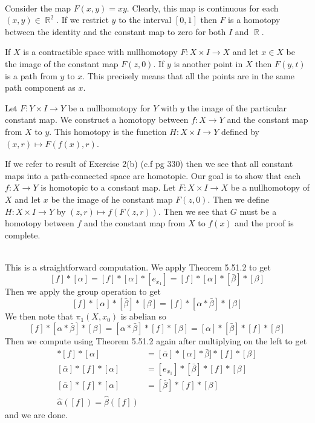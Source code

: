 \documentclass{article}
\DeclareMathOperator{\R}{\mathbb{R}}
\newcommand{\problem}[1]{\noindent{\textbf{Problem #1}}\\}
\newcommand{\problempart}[1]{\noindent{\textbf{(#1)}}}
\begin{document}
\problem{9.51.3}
\problempart{a} Consider the map $F(x,y) = xy$. Clearly, this map is continuous for each $(x,y) \in \R^2$. If we restrict $y$ to the interval $[0,1]$ then $F$ is a homotopy between the identity and the constant map to zero for both $I$ and $\R$. 

\problempart{b} If $X$ is a contractible space with nullhomotopy $F: X \times I \to X$ and let $x \in X$ be the image of the constant map $F(z,0)$. If $y$ is another point in $X$ then $F(y,t)$ is a path from $y$ to $x$. This precisely means that all the points are in the same path component as $x$. 

\problempart{c} Let $F: Y \times I \to Y$ be a nullhomotopy for $Y$ with $y$ the image of the particular constant map. We construct a homotopy between $f: X \to Y$ and the constant map from $X$ to $y$. This homotopy is the function $H: X \times I \to Y$ defined by $(x,r) \mapsto F(f(x), r)$.  

\problempart{d} If we refer to result of Exercise 2(b) (c.f pg 330) then we see that all constant maps into a path-connected space are homotopic. Our goal is to show that each $f: X \to Y$ is homotopic to a constant map. Let $F: X \times I \to X$ be a nullhomotopy of $X$ and let $x$ be the image of he constant map $F(z,0)$. Then we define $H: X\times I \to Y$ by $(z,r) \mapsto f(F(z,r))$. Then we see that $G$ must be a homotopy between $f$ and the constant map from $X$ to $f(x)$ and the proof is complete. 

\problem{9.52.3} This is a straightforward computation. We apply Theorem 5.51.2 to get
\[
[f] * [\alpha] = [f] * [\alpha] * [e_{x_1}] = [f] * [\alpha] * [\bar{\beta}] * [\beta] 
\]
Then we apply the group operation to get
\[
[f] * [\alpha] * [\bar{\beta}] * [\beta] = [f] * [\alpha * \bar{\beta}] * [\beta]
\]
We then note that $\pi_1(X,x_0)$ is abelian so 
\[
[f] * [\alpha * \bar{\beta}] * [\beta] = [\alpha * \bar{\beta}] * [f] * [\beta] = [\alpha]*[\bar{\beta}]*[f]*[\beta]
\]
Then we compute using Theorem 5.51.2 again after multiplying on the left to get
\begin{align*}
[\bar{\alpha}]*[f]*[\alpha] &= [\bar{\alpha}]*[\alpha] * \bar{\beta}] * [f] * [\beta] \\
[\bar{\alpha}]*[f]*[\alpha]  &= [e_{x_1}] * [\bar{\beta}] * [f] * [\beta] \\
[\bar{\alpha}]*[f]*[\alpha] &= [\bar{\beta}] * [f] * [\beta] \\
\hat{\alpha}([f]) = \hat{\beta}([f])
\end{align*}
and we are done.
\end{document}
